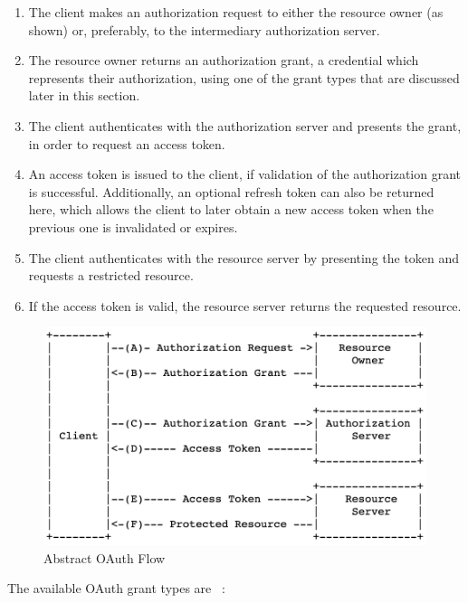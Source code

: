\begin{enumerate} [(A.)]
	\item The client makes an authorization request to either the resource owner  (as shown) or, preferably, to the intermediary authorization server. 
	
	\item The resource owner returns an authorization grant, a credential which represents their authorization, using one of the grant types that are discussed later in this section. 
	
	\item The client authenticates with the authorization server and presents the grant, in order to request an access token.
	
	\item An access token is issued to the client, if validation of the authorization grant is successful. Additionally, an optional refresh token can also be returned here, which allows the client to later obtain a new access token when the previous one is invalidated or expires.
	
	\item  The client authenticates with the resource server by presenting the token and requests a restricted resource.
	
	\item If the access token is valid, the resource server returns the requested resource.
\end{enumerate}

\begin{figure} [h]
	\centering
	\includegraphics[scale=0.7]{images/oauth_flow}
	\caption{\label{fig:oauth_flow}Abstract OAuth Flow}
\end{figure}

The available OAuth grant types are ~\cite{oauth, oauth_grants}:

